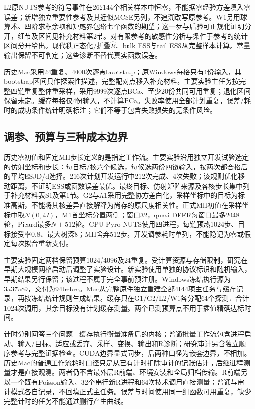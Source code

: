 \documentclass[UTF8,fontset=fandol,zihao=-4]{ctexart}
\begin{document}
L2原NUTS参考的符号事件在262144个相关样本中恒零，不能据零经验方差填入零误差；新增独立重要性参考及其近似MCSE另列，不追溯改写原参考。W1另用球算术、四阶求积余项和矩尾界包络七个函数的期望；这一步与后验可正规化证明分开，细节及区间见补充材料第2节。对有限参考的敏感性分析与条件于参考的统计区间分开给出。现代秩正态化/折叠$\hat R$、bulk ESS与tail ESS从完整样本计算\cite{vehtari,posterior}，常量输出保留不可判定；这些诊断不替代真实函数误差。

历史Mac采用24重复、4000次逐点bootstrap；原Windows每格只有4份输入，其bootstrap区间只作探索性描述，完整配对点移入补充材料。主要实验主任务按完整四链重复整体重采样，采用9999次逐点BCa、至少20份共同可用重复；退化区间保留未定。缓存每格仅4份输入，不计算BCa。失败率使用全部计划重复，误差/耗时的成功条件统计明确标注；它们不等于包含失败损失的无条件风险。

\subsection{调参、预算与三种成本边界}
历史零初值和固定MH步长定义的是指定工作流。主要实验沿用独立开发试验选定的仿射坐标和步长：每目标/核六个候选，每候选两份四链输入，按两次都合格后的平均ESJD/d选择。216次计划开发运行中212次完成、4次失败；该规则优化移动距离，不证明ESS或函数误差最优。最终目标、仿射矩阵来源及各核步长集中列于补充材料表S1及第1节。G2与A1采用完整协方差白化，采样坐标中的目标为标准高斯，不能将其核差异直接解释为尚存的原尺度相关性。正式MH初值在采样坐标中取$N(0,4I)$，M1首坐标分置两侧；窗口32，quasi-DEER每窗口最多2048轮，Picard最多$N+512$轮。CPU Pyro NUTS使用四进程，每链预热1024步、目标接受率0.8、最大树深8；MH舍弃512步。开发调参耗时单列，不能隐记为零或假定每次拟合重新支付。

主要实验固定两档保留预算1024/4096及24重复。受计算资源与存储限制，研究在早期大规模网格启动后调整了实验设计。新实验使用单独的协议标识和随机输入，早期结果另行保留；该过程不属于完全事前预注册。Windows冻结执行源为3a37a89，交付为94bebec。Mac从完整原件独立重建全部4144项主任务与缓存记录，再按冻结统计规则生成结果。缓存只在G1/G2/L2/W1各分配64个探测，合计1024次调用，其余目标没有计划缓存测量。两个已测预算点不用于插值精确达标时间。

计时分别回答三个问题：缓存执行衡量准备后的内核；普通批量工作流包含进程启动、输入/目标、适应或丢弃、采样、变换、输出和R诊断；研究审计另含独立顺序参考与完整证据检查。CUDA边界显式同步，后两种口径为嵌套边界，不相加。历史Mac的普通工作流耗时口径只是从已有计时扣除审计的记账估计；后继进程测量才是直接观测。两者仍不含最外层R前端、环境安装和全局归档传输。R前端另以一个既有Poisson输入、32个串行新R进程和64次技术调用直接测量；普通与审计模式各自记录，不回填正式主任务。误差与时间使用同一组函数可用重复，缺少完整计时的任务不能通过删行产生曲线。
\end{document}
